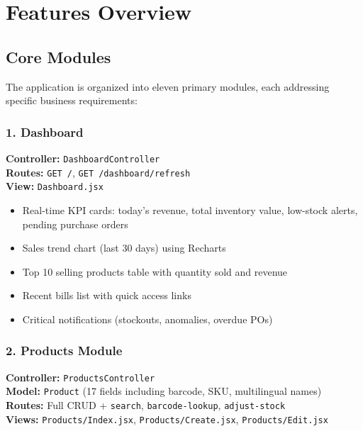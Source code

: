 \section{Features Overview}

\subsection{Core Modules}

The application is organized into eleven primary modules, each addressing specific business requirements:

\subsubsection{1. Dashboard}

\textbf{Controller:} \texttt{DashboardController}\\
\textbf{Routes:} \texttt{GET /}, \texttt{GET /dashboard/refresh}\\
\textbf{View:} \texttt{Dashboard.jsx}

\begin{itemize}
    \item Real-time KPI cards: today's revenue, total inventory value, low-stock alerts, pending purchase orders
    \item Sales trend chart (last 30 days) using Recharts
    \item Top 10 selling products table with quantity sold and revenue
    \item Recent bills list with quick access links
    \item Critical notifications (stockouts, anomalies, overdue POs)
\end{itemize}

\subsubsection{2. Products Module}

\textbf{Controller:} \texttt{ProductsController}\\
\textbf{Model:} \texttt{Product} (17 fields including barcode, SKU, multilingual names)\\
\textbf{Routes:} Full CRUD + \texttt{search}, \texttt{barcode-lookup}, \texttt{adjust-stock}\\
\textbf{Views:} \texttt{Products/Index.jsx}, \texttt{Products/Create.jsx}, \texttt{Products/Edit.jsx}

